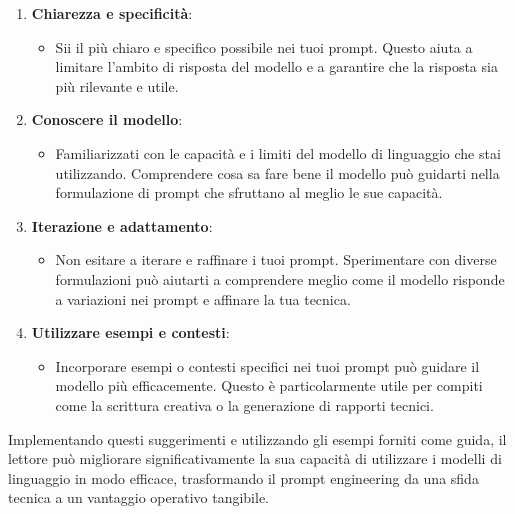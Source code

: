             \begin{enumerate}[start=1,label={\bfseries{}S\arabic*.}]
                \item \textbf{Chiarezza e specificità}:
                    \begin{itemize}
                        \item Sii il più chiaro e specifico possibile nei tuoi prompt. Questo aiuta a limitare l'ambito di risposta del modello e a garantire che la risposta sia più rilevante e utile.
                    \end{itemize}
                    
                    
                \item \textbf{Conoscere il modello}:
                    \begin{itemize}
                        \item Familiarizzati con le capacità e i limiti del modello di linguaggio che stai utilizzando. Comprendere cosa sa fare bene il modello può guidarti nella formulazione di prompt che sfruttano al meglio le sue capacità.
                    \end{itemize}
                    
                \item \textbf{Iterazione e adattamento}:
                    \begin{itemize}
                        \item Non esitare a iterare e raffinare i tuoi prompt. Sperimentare con diverse formulazioni può aiutarti a comprendere meglio come il modello risponde a variazioni nei prompt e affinare la tua tecnica.
                    \end{itemize}
                    
                \item \textbf{Utilizzare esempi e contesti}:
                    \begin{itemize}
                        \item Incorporare esempi o contesti specifici nei tuoi prompt può guidare il modello più efficacemente. Questo è particolarmente utile per compiti come la scrittura creativa o la generazione di rapporti tecnici.
                    \end{itemize}
            \end{enumerate}

            Implementando questi suggerimenti e utilizzando gli esempi forniti come guida, il lettore può migliorare significativamente la sua capacità di utilizzare i modelli di linguaggio in modo efficace, trasformando il prompt engineering da una sfida tecnica a un vantaggio operativo tangibile.
